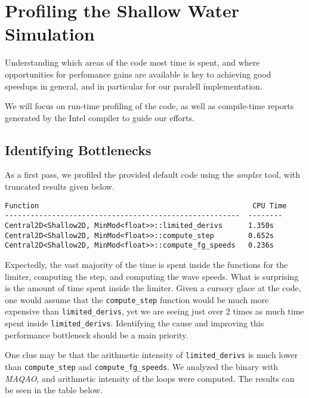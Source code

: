 \section{Profiling the Shallow Water Simulation}
\label{sec-profile}

Understanding which areas of the code most time is spent, and where opportunities for 
perfomance gains are available is key to achieving good speedups in general, and
in particular for our paralell implementation.

We will focus on run-time profiling of the code, as well as compile-time reports generated
by the Intel compiler to guide our efforts.

\subsection{Identifying Bottlenecks}
\label{sec-profile-bottlenecks}
As a first pass, we profiled the provided default code using the \emph{amplxe} tool, with 
truncated results given below.

\begin{lstlisting}
Function                                                  CPU Time
-------------------------------------------------------  -------- 
Central2D<Shallow2D, MinMod<float>>::limited_derivs      1.350s
Central2D<Shallow2D, MinMod<float>>::compute_step        0.652s
Central2D<Shallow2D, MinMod<float>>::compute_fg_speeds   0.236s 
\end{lstlisting}

Expectedly, the vast majority of the time is spent inside the functions for the limiter,
computing the step, and computing the wave speeds.  What is surprising is the amount of 
time spent inside the limiter.  Given a cursory glace at the code, one would assume that
the \texttt{compute\_step} function would be much more expensive than \texttt{limited\_derivs}, 
yet we are seeing just over 2 times as much time spent inside \texttt{limited\_derivs}.
Identifying the cause and improving this performance bottleneck should be a main priority.

One clue may be that the arithmetic intensity of \texttt{limited\_derivs} is much lower than
\texttt{compute\_step} and \texttt{compute\_fg\_speeds}.  We analyzed the binary with \emph{MAQAO},
and arithmetic intensity of the loops were computed.  The results can be seen in the table below.

